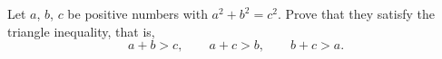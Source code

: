 Let $a$, $b$, $c$ be positive numbers with $a^2+b^2=c^2$. Prove that they satisfy the triangle inequality, that is,
\[a+b>c,\qquad a+c>b,\qquad b+c>a.\]
